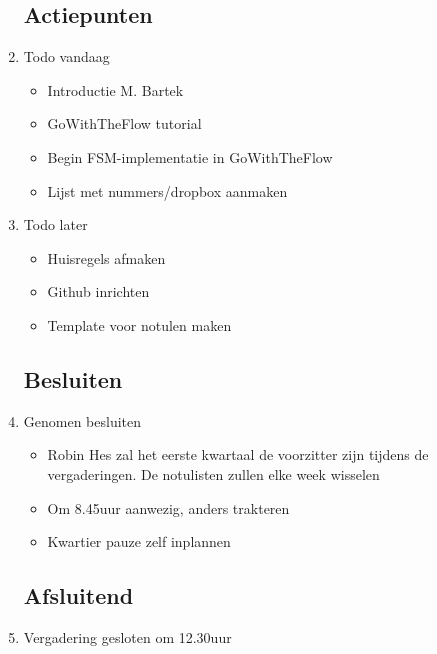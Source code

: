 \documentclass{article}
\begin{document}
\begin{enumerate}
	\subsection*{Actiepunten}
	\item Todo vandaag
	\begin{itemize}
		\item Introductie M. Bartek
		\item GoWithTheFlow tutorial
		\item Begin FSM-implementatie in GoWithTheFlow
		\item Lijst met nummers/dropbox aanmaken
	\end{itemize}
	\item Todo later
	\begin{itemize}
		\item Huisregels afmaken
		\item Github inrichten
		\item Template voor notulen maken
	\end{itemize}

	\subsection*{Besluiten}
	\item Genomen besluiten
	\begin{itemize}
		\item Robin Hes zal het eerste kwartaal de voorzitter zijn tijdens de vergaderingen. De notulisten zullen elke week wisselen
		\item Om 8.45uur aanwezig, anders trakteren
		\item Kwartier pauze zelf inplannen
	\end{itemize}

	\noindent 
	\subsection*{Afsluitend}
	\item Vergadering gesloten om 12.30uur%

\end{enumerate}
\end{document}
